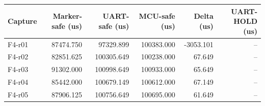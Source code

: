 \begin{tabular}{lrrrrr}
Capture & Marker-safe (us) & UART-safe (us) & MCU-safe (us) & Delta (us) & UART-HOLD (us) \\
\hline
F4-r01 & 87474.750 & 97329.899 & 100383.000 & -3053.101 & -- \\
F4-r02 & 82851.625 & 100305.649 & 100238.000 & 67.649 & -- \\
F4-r03 & 91302.000 & 100998.649 & 100933.000 & 65.649 & -- \\
F4-r04 & 85442.000 & 100679.149 & 100612.000 & 67.149 & -- \\
F4-r05 & 87906.125 & 100756.649 & 100695.000 & 61.649 & -- \\
\end{tabular}
